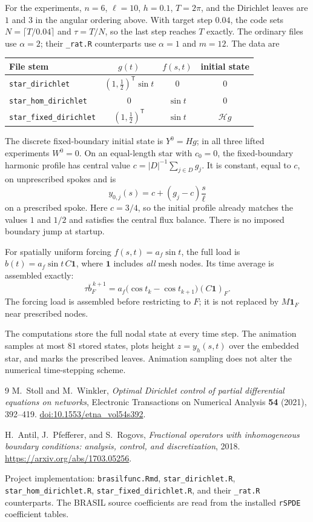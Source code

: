 \documentclass[11pt,a4paper]{article}
\newcommand{\trans}{^{\mathsf T}}
\begin{document}
For the experiments, $n=6$, $\ell=10$, $h=0.1$, $T=2\pi$, and the
Dirichlet leaves are $1$ and $3$ in the angular ordering above.
With target step $0.04$, the code sets
$N=\lceil T/0.04\rceil$ and $\tau=T/N$, so the last step reaches $T$
exactly. The ordinary files use $\alpha=2$; their
\texttt{\_rat.R} counterparts use $\alpha=1$ and $m=12$.
The data are
\begin{center}
\begin{tabular}{@{}lccc@{}}
\toprule
File stem & $g(t)$ & $f(s,t)$ & initial state\\
\midrule
\texttt{star\_dirichlet} & $(1,\tfrac12)\trans\sin t$ & $0$ & $0$\\
\texttt{star\_hom\_dirichlet} & $0$ & $\sin t$ & $0$\\
\texttt{star\_fixed\_dirichlet} & $(1,\tfrac12)\trans$ & $\sin t$
 & $\mathcal H g$\\
\bottomrule
\end{tabular}
\end{center}
The discrete fixed-boundary initial state is $Y^0=Hg$; in all three
lifted experiments $W^0=0$. On an equal-length star with $c_0=0$,
the fixed-boundary harmonic profile has central value
$c=|D|^{-1}\sum_{j\in D}g_j$. It is constant, equal to $c$, on
unprescribed spokes and is
\[
 y_{0,j}(s)=c+(g_j-c)\frac{s}{\ell}
\]
on a prescribed spoke. Here $c=3/4$, so the initial profile already
matches the values $1$ and $1/2$ and satisfies the central flux balance.
There is no imposed boundary jump at startup.

For spatially uniform forcing $f(s,t)=a_f\sin t$, the full load is
$b(t)=a_f\sin t\,C\boldsymbol 1$, where $\boldsymbol1$ includes
\emph{all} mesh nodes. Its time average is assembled exactly:
\[
 \tau\overline b_F^{\,k+1}
 =a_f\bigl(\cos t_k-\cos t_{k+1}\bigr)(C\boldsymbol1)_F.
\]
The forcing load is assembled before restricting to $F$; it is not
replaced by $M\boldsymbol1_F$ near prescribed nodes.

The computations store the full nodal state at every time step. The
animation samples at most $81$ stored states, plots height $z=y_h(s,t)$
over the embedded star, and marks the prescribed leaves. Animation
sampling does not alter the numerical time-stepping scheme.

\begin{thebibliography}{9}
M.~Stoll and M.~Winkler,
\emph{Optimal Dirichlet control of partial differential equations on networks},
Electronic Transactions on Numerical Analysis \textbf{54} (2021), 392--419.
\href{https://doi.org/10.1553/etna_vol54s392}{doi:10.1553/etna\_vol54s392}.

H.~Antil, J.~Pfefferer, and S.~Rogovs,
\emph{Fractional operators with inhomogeneous boundary conditions:
analysis, control, and discretization}, 2018.
\url{https://arxiv.org/abs/1703.05256}.

Project implementation: \texttt{brasilfunc.Rmd},
\texttt{star\_dirichlet.R}, \texttt{star\_hom\_dirichlet.R},
\texttt{star\_fixed\_dirichlet.R}, and their
\texttt{\_rat.R} counterparts.
The BRASIL source coefficients are read from the installed
\texttt{rSPDE} coefficient tables.
\end{thebibliography}
\end{document}

